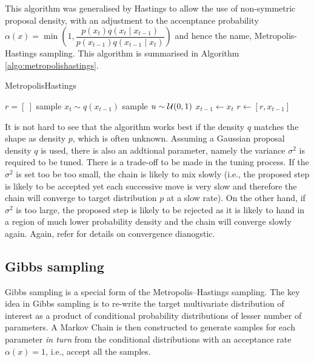 This algorithm was generalised by Hastings \cite{WKH70} to allow the use of non-symmetric proposal density, with an adjustment to the accenptance probability $\alpha(x) = \min\left(1, \dfrac{p(x_t)q(x_t \mid x_{t-1})}{p(x_{t-1})q(x_{t-1} \mid x_{t})}\right)$ and hence the name, Metropolis-Hastings sampling. This algorithm is summarised in Algorithm \ref{algo:metropolishastings}.

\begin{algorithm}
\caption{MetropolisHastings}\label{algo:metropolishastings}
\begin{algorithmic}[1]
\State $r = [\ ]$
\Repeat
  \State sample $x_t \sim q(x_{t-1})$
  \State sample $u \sim {\cal U}(0,1)$
    \State $x_{t-1} \gets x_{t}$
    \State $r \gets [r,x_{t-1}]$
  \EndIf
{}
\EndFunction
\end{algorithmic}
\end{algorithm}

It is not hard to see that the algorithm works best if the density $q$ matches the shape as density $p$, which is often unknown. Assuming a Gaussian proposal density $q$ is used, there is also an addtional parameter, namely the variance $\sigma^2$ is required to be tuned. There is a trade-off to be made in the tuning process. If the $\sigma^2$ is set too be too small, the chain is likely to mix slowly (i.e., the proposed step is likely to be accepted yet each successive move is very slow and therefore the chain will converge to target distribution $p$ at a slow rate). On the other hand, if $\sigma^2$ is too large, the proposed step is likely to be rejected as it is likely to hand in a region of much lower probability density and the chain will converge slowly again. Again, refer \cite{RCP05} for details on convergence dianogstic.

\subsection{Gibbs sampling}
Gibbs sampling \cite{GS84} is a special form of the Metropolis–Hastings sampling. The key idea in Gibbs sampling is to re-write the target multivariate distribution of interest as a product of conditional probability distributions of lesser number of parameters. A Markov Chain is then constructed to generate samples for each parameter \emph{in turn} from the conditional distributions with an acceptance rate $\alpha(x)=1$, i.e., accept all the samples.

